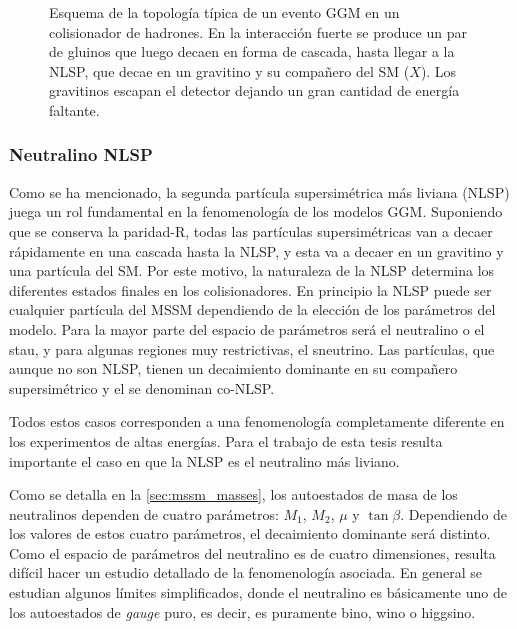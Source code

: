 \begin{figure}[!htbp]
  \centering

  

  \caption{Esquema de la topología típica de un evento GGM en un colisionador de
    hadrones. En la interacción fuerte se produce un par de gluinos que luego
    decaen en forma de cascada, hasta llegar a la NLSP, que decae en un
    gravitino {\gravino} y su compañero del SM ($X$). Los gravitinos escapan el
    detector dejando un gran cantidad de energía faltante.}
  \label{fig:ggm_event}
\end{figure}


\subsubsection{Neutralino NLSP}

Como se ha mencionado, la segunda partícula supersimétrica más liviana (NLSP)
juega un rol fundamental en la fenomenología de los modelos GGM. Suponiendo que
se conserva la paridad-R, todas las partículas supersimétricas van a decaer
rápidamente en una cascada hasta la NLSP, y esta va a decaer en un gravitino y
una partícula del SM. Por este motivo, la naturaleza de la NLSP determina los
diferentes estados finales en los colisionadores. En principio la NLSP puede ser
cualquier partícula del MSSM dependiendo de la elección de los parámetros del
modelo. Para la mayor parte del espacio de parámetros será el neutralino o el
stau, y para algunas regiones muy restrictivas, el
sneutrino\cite{arxiv:9801271}. Las partículas, que aunque no son NLSP, tienen un
decaimiento dominante en su compañero supersimétrico y el {\gravino} se
denominan co-NLSP.

Todos estos casos corresponden a una fenomenología completamente diferente en
los experimentos de altas energías. Para el trabajo de esta tesis resulta
importante el caso en que la NLSP es el neutralino más liviano.

Como se detalla en la \cref{sec:mssm_masses}, los autoestados de masa de los
neutralinos dependen de cuatro parámetros: $M_1$, $M_2$, $\mu$ y $\tan\beta$.
Dependiendo de los valores de estos cuatro parámetros, el decaimiento dominante
será distinto. Como el espacio de parámetros del neutralino es de cuatro
dimensiones, resulta difícil hacer un estudio detallado de la fenomenología asociada.
En general se estudian algunos límites simplificados, donde el neutralino
es básicamente uno de los autoestados de \emph{gauge} puro, es decir, es puramente
bino, wino o higgsino. %

